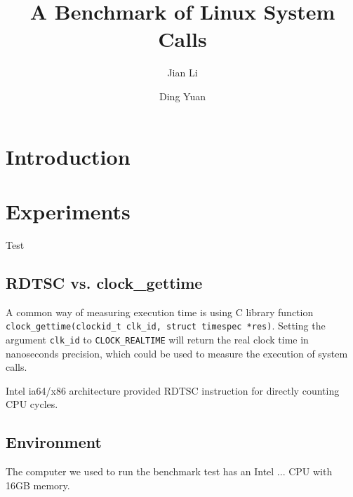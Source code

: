 \documentclass{article}
\begin{document}
\title{A Benchmark of Linux System Calls}
\author{Jian Li \and Ding Yuan}
\maketitle

\section{Introduction}

\section{Experiments}

Test 

\subsection{RDTSC vs. clock\_gettime}

A common way of measuring execution time is using C library function \lstinline{clock_gettime(clockid_t clk_id, struct timespec *res)}.
Setting the argument \lstinline{clk_id} to \lstinline{CLOCK_REALTIME} will return the real clock time in nanoseconds precision,
which could be used to measure the execution of system calls.

Intel ia64/x86 architecture provided RDTSC instruction for directly counting CPU cycles. 


\subsection{Environment}

The computer we used to run the benchmark test has an Intel ... CPU with 16GB memory.
\end{document}
